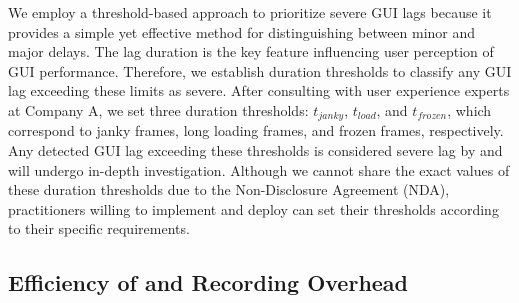 We employ a threshold-based approach to prioritize severe GUI lags because it provides a simple yet effective method for distinguishing between minor and major delays. 
The lag duration is the key feature influencing user perception of GUI performance. Therefore, we establish duration thresholds to classify any GUI lag exceeding these limits as severe. 
After consulting with user experience experts at Company A, we set three duration thresholds: $t_{janky}$,  $t_{load}$, and $t_{frozen}$, which correspond to janky frames, long loading frames, and frozen frames, respectively.
Any detected GUI lag exceeding these thresholds is considered severe lag by \tool and will undergo in-depth investigation. Although we cannot share the exact values of these duration thresholds due to the Non-Disclosure Agreement (NDA), practitioners willing to implement and deploy \tool can set their thresholds according to their specific requirements. 

\begin{comment}
\subsection{Determining threshold}
To determine the threshold, we analyze a dataset of 3,854 GUI unlabeled screencasts from mobile testing. The \textit{Threshold Determination} phase is only performed once, prior to the deployment of \tool. Specifically, we analyze the unlabeled screencasts to detect GUI lags and use statistical analysis to calculate the distribution of their duration. Based on this distribution, we set the threshold for severe lags at the 80th percentile, resulting in thresholds of 200ms, 300ms, and 1500ms for the three types of GUI lags, respectively. Any detected GUI lag exceeding these thresholds is considered as severe. \wei{@Peter This method for determining the threshold may look fancy, but it raises logical concerns. Why should the 80th percentile of duration be the best choice for identifying severe GUI lags? }
\end{comment}

\subsection{Efficiency of \tool and Recording Overhead}
\label{sec:implementation}

